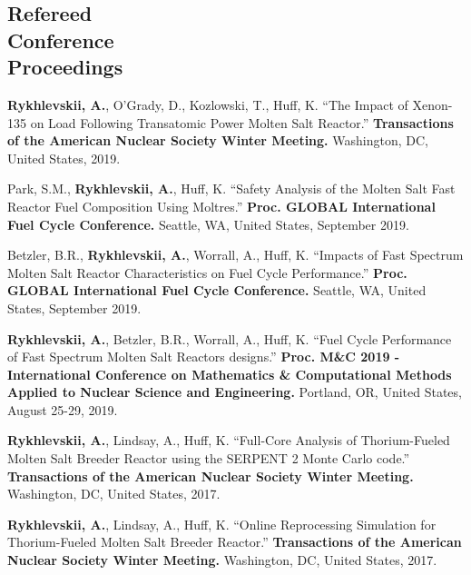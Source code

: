 \documentclass[margin,line]{resume}
\begin{document}
\begin{resume}
    \section{\mysidestyle Refereed\\Conference\\Proceedings}
    \begin{bibenum}
     \item \textbf{Rykhlevskii, A.}, O'Grady, D., Kozlowski, T., Huff, K. 
     ``The Impact of Xenon-135 on Load Following Transatomic Power Molten Salt 
     Reactor.'' \textbf{Transactions of the American Nuclear Society Winter 
     Meeting.} Washington, DC, United States, 2019.
     \item Park, S.M., \textbf{Rykhlevskii, A.}, Huff, K. 
	``Safety Analysis of the Molten Salt Fast Reactor Fuel Composition Using 
	Moltres.'' \textbf{Proc. GLOBAL International Fuel Cycle Conference.} Seattle, WA, United States, September 2019.    
     \item Betzler, B.R., \textbf{Rykhlevskii, A.}, Worrall, A., Huff, K. 
     ``Impacts of Fast Spectrum Molten Salt Reactor Characteristics on Fuel 
     Cycle Performance.'' \textbf{Proc. GLOBAL International Fuel Cycle 
     Conference.} Seattle, WA, United States, September 2019.    
    \item \textbf{Rykhlevskii, A.}, Betzler, B.R., Worrall, A., Huff, K. ``Fuel Cycle Performance of Fast Spectrum Molten Salt Reactors designs.'' \textbf{Proc. M\&C 2019 - International Conference on Mathematics \& Computational Methods Applied to Nuclear Science and Engineering.} 
            Portland, OR, United States, August 25-29, 2019.    
    \item \textbf{Rykhlevskii, A.}, Lindsay, A., Huff, K. ``Full-Core Analysis of Thorium-Fueled Molten Salt Breeder Reactor using the SERPENT 2 Monte Carlo code.'' 
            \textbf{Transactions of the American Nuclear Society Winter Meeting.} 
            Washington, DC, United States, 2017.
    \item \textbf{Rykhlevskii, A.}, Lindsay, A., Huff, K. ``Online Reprocessing Simulation for Thorium-Fueled Molten Salt Breeder Reactor.'' 
            \textbf{Transactions of the American Nuclear Society Winter Meeting.} 
            Washington, DC, United States, 2017.
	\end{bibenum}

\end{resume}
\end{document}
